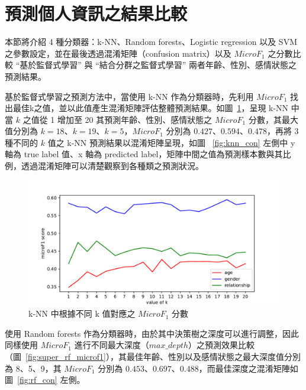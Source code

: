 \section{預測個人資訊之結果比較}
{
本節將介紹 4 種分類器：k-NN、Random forests、Logistic regression 以及 SVM 之參數設定，並在最後透過混淆矩陣（confusion matrix）以及 $MicroF_1$ 之分數比較 “基於監督式學習” 與 “結合分群之監督式學習” 兩者年齡、性別、感情狀態之預測結果。 \par

\clearpage

基於監督式學習之預測方法中，當使用 k-NN 作為分類器時，先利用 $MicroF_1$ 找出最佳k之值，並以此值產生混淆矩陣評估整體預測結果。如圖~\ref{fig:super_knn_microf1}，呈現 k-NN 中當 $k$ 之值從 1 增加至 20 其預測年齡、性別、感情狀態之 $MicroF_1$ 分數，其最大值分別為 $k=18$、$k=19$、$k=5$，$MicroF_1$ 分別為 $0.427$、$0.594$、$0.478$，再將 3 種不同的 $k$ 值之 k-NN 預測結果以混淆矩陣呈現，如圖 ~\ref{fig:knn_con} 左側中 y 軸為 true label 值、x 軸為 predicted label，矩陣中間之值為預測樣本數與其比例，透過混淆矩陣可以清楚觀察到各種類之預測狀況。\par

\begin{figure}[h]
    \graphicspath{{fig/}}
    \begin{center}
    \includegraphics[scale=0.5]{fig/super_knn_microf1.pdf}
    \caption{k-NN 中根據不同 k 值對應之 $MicroF_1$ 分數}
    \label{fig:super_knn_microf1}
    \end{center}
\end{figure}


使用 Random forests 作為分類器時，由於其中決策樹之深度可以進行調整，因此同樣使用 $MicroF_1$ 進行不同最大深度（$max \_depth$）之預測效果比較（圖~\ref{fig:super_rf_microf1}），其最佳年齡、性別以及感情狀態之最大深度值分別為 8、5、9，其 $MicroF_1$ 分別為 $0.453$、$0.697$、$0.488$，而最佳深度之混淆矩陣如圖~\ref{fig:rf_con} 左側。\par

}
